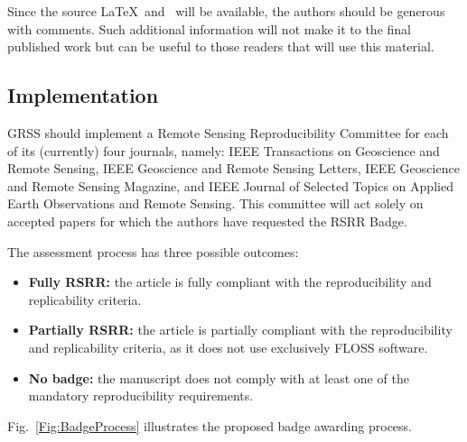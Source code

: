 \documentclass[journal,twoside]{IEEEtran}
\begin{document}
Since the source \LaTeX\ and \BibTeX\ will be available, the authors should be generous with comments.
Such additional information will not make it to the final published work but can be useful to those readers that will use this material.


\subsection{Implementation}\label{Sec:Implementation}

GRSS should implement a Remote Sensing Reproducibility Committee for each of its (currently) four journals, namely:
IEEE Transactions on Geoscience and Remote Sensing,
IEEE Geoscience and Remote Sensing Letters,
IEEE Geoscience and Remote Sensing Magazine, and
IEEE Journal of Selected Topics on Applied Earth Observations and Remote Sensing.
This committee will act solely on accepted papers for which the authors have requested the RSRR Badge.

The assessment process has three possible outcomes:
\begin{itemize}
	\item \textbf{Fully RSRR:} the article is fully compliant with the reproducibility and replicability criteria.
	\item \textbf{Partially RSRR:} the article is partially compliant with the reproducibility and replicability criteria, as it does not use exclusively FLOSS software.
	\item \textbf{No badge:} the manuscript does not comply with at least one of the mandatory reproducibility requirements.
\end{itemize}

Fig.~\ref{Fig:BadgeProcess} illustrates the proposed badge awarding process.
\end{document}
